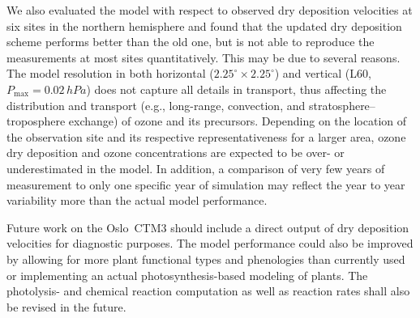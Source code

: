 \documentclass[gmd, manuscript]{copernicus}
\begin{document}
We also evaluated the model with respect to observed dry deposition velocities at six sites in the northern hemisphere and found that the updated dry deposition scheme performs better than the old one, but is not able to reproduce the measurements at most sites quantitatively. This may be due to several reasons. The model resolution in both horizontal ($2.25^\circ\times 2.25^\circ$) and vertical (L60, $P_\text{max}=0.02\,\unit{hPa}$) does not capture all details in transport, thus affecting the distribution and transport (e.g., long-range, convection, and stratosphere--troposphere exchange) of ozone and its precursors. Depending on the location of the observation site and its respective representativeness for a larger area, ozone dry deposition and ozone concentrations are expected to be over- or underestimated in the model. In addition, a comparison of very few years of measurement to only one specific year of simulation may reflect the year to year variability more than the actual model performance.

Future work on the Oslo~CTM3 should include a direct output of dry deposition velocities for diagnostic purposes. The model performance could also be improved by allowing for more plant functional types and phenologies than currently used or implementing an actual photosynthesis-based modeling of plants. The photolysis- and chemical reaction computation as well as reaction rates shall also be revised in the future.










\end{document}
